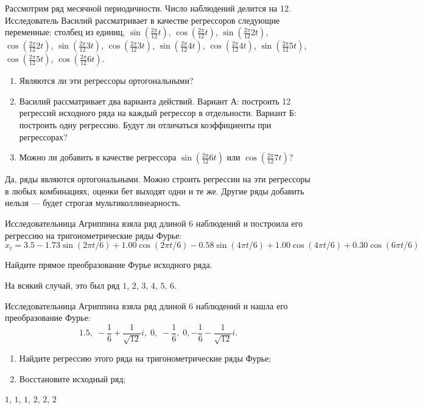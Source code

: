 \begin{problem}
  Рассмотрим ряд месячной периодичности. Число наблюдений делится на 12. Исследователь Василий рассматривает в качестве регрессоров следующие переменные: столбец из единиц,
  $\sin\left(\frac{2\pi}{12} t\right)$, 
 $\cos\left(\frac{2\pi}{12} t\right)$, 
 $\sin\left(\frac{2\pi}{12} 2t\right)$, 
 $\cos\left(\frac{2\pi}{12} 2t\right)$, 
 $\sin\left(\frac{2\pi}{12} 3t\right)$, 
 $\cos\left(\frac{2\pi}{12} 3t\right)$, 
 $\sin\left(\frac{2\pi}{12} 4t\right)$, 
 $\cos\left(\frac{2\pi}{12} 4t\right)$, 
 $\sin\left(\frac{2\pi}{12} 5t\right)$, 
 $\cos\left(\frac{2\pi}{12} 5t\right)$, 
 $\cos\left(\frac{2\pi}{12} 6t\right)$.

 \begin{enumerate}
   \item Являются ли эти регрессоры ортогональными?
   \item Василий рассматривает два варианта действий. 
     Вариант А: построить 12 регрессий исходного ряда на каждый регрессор в отдельности. Вариант Б: построить одну регрессию.
     Будут ли отличаться коэффициенты при регрессорах?
    \item Можно ли добавить в качестве регрессора $\sin\left(\frac{2\pi}{12} 6t\right)$ или  $\cos\left(\frac{2\pi}{12} 7t\right)$?
  \end{enumerate}
 \begin{sol}
   Да, ряды являются ортогональными. Можно строить регрессии на эти регрессоры в любых комбинациях, оценки бет выходят одни и те же.
   Другие ряды добавить нельзя — будет строгая мультиколлинеарность.
 \end{sol}
 \end{problem}

 \begin{problem}
   Исследовательница Агриппина взяла ряд длиной 6 наблюдений и построила его регрессию на тригонометрические ряды Фурье:
   \[
     \hat x_t = 3.5 - 1.73 \sin(2\pi t/6) + 1.00 \cos(2\pi t/6) - 0.58\sin(4\pi t/6) + 1.00 \cos(4\pi t/6) +0.30 \cos(6\pi t/6)
   \]

   Найдите прямое преобразование Фурье исходного ряда.
   \begin{sol}
     На всякий случай, это был ряд $1$, $2$, $3$, $4$, $5$, $6$.
   \end{sol}
 \end{problem}


 \begin{problem}
   Исследовательница Агриппина взяла ряд длиной 6 наблюдений и нашла его преобразование Фурье: 
   \[
     1.5, \; -\frac{1}{6}+\frac{1}{\sqrt{12}}i, \; 0, \; -\frac{1}{6}, \; 0, -\frac{1}{6} - \frac{1}{\sqrt{12}}i.
   \]
   \begin{enumerate}
     \item Найдите регрессию этого ряда на тригонометрические ряды Фурье;
     \item Восстановите исходный ряд;
   \end{enumerate}

   \begin{sol}
   $1$, $1$, $1$, $2$, $2$, $2$
   \end{sol}
 \end{problem}


